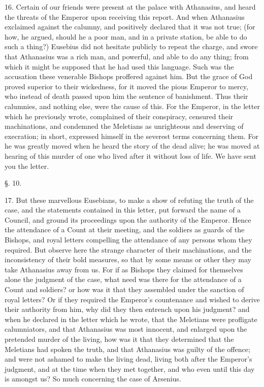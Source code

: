 16. Certain of our friends were present at the
palace with Athanasius, and heard the threats of the Emperor upon
receiving this report. And when Athanasius exclaimed against the
calumny, and positively declared that it was not true; (for how, he
argued, should he a poor man, and in a private station, be able to do
such a thing?) Eusebius did not hesitate publicly to repeat the
charge, and swore that Athanasius was a rich man, and powerful, and
able to do any thing; from which it might be supposed that he had used
this language. Such was the accusation these venerable Bishops
proffered against him. But the grace of God proved superior to their
wickedness, for it moved the pious Emperor to mercy, who instead of
death passed upon him the sentence of banishment. Thus their
calumnies, and nothing else, were the cause of this. For the Emperor,
in the letter which he previously wrote, complained of their
conspiracy, censured their machinations, and condemned the Meletians
as unrighteous and deserving of execration; in short, expressed
himself in the severest terms concerning them. For he was greatly
moved when he heard the story of the dead alive; he was moved at
hearing of this murder of one who lived after it without loss of life.
We have sent you the letter.

§. 10.

17. But these marvellous Eusebians, to make a
show of refuting the truth of the case, and the statements contained
in this letter, put forward the name of a Council, and ground its
proceedings upon the authority of the Emperor. Hence the attendance of
a Count at their meeting, and the soldiers as guards of the Bishops,
and royal letters compelling the attendance of any persons whom
they required. But observe here the strange character of their
machinations, and the inconsistency of their bold measures, so that by
some means or other they may take Athanasius away from us. For if as
Bishops they claimed for themselves alone the judgment of the case,
what need was there for the attendance of a Count and soldiers? or how
was it that they assembled under the sanction of royal letters? Or if
they required the Emperor's countenance and wished to derive their
authority from him, why did they then entrench upon his judgment? and
when he declared in the letter which he wrote, that the Meletians were
profligate calumniators, and that Athanasius was most innocent, and
enlarged upon the pretended murder of the living, how was it that they
determined that the Meletians had spoken the truth, and that
Athanasius was guilty of the offence; and were not ashamed to make the
living dead, living both after the Emperor's judgment, and at the time
when they met together, and who even until this day is amongst us? So
much concerning the case of Arsenius.

